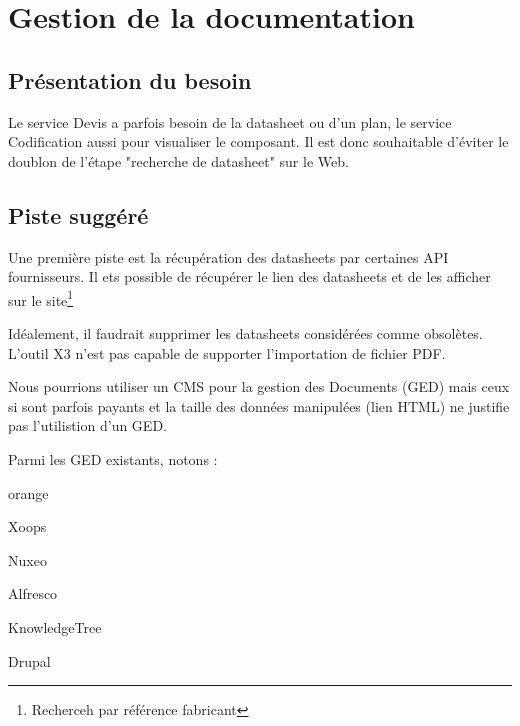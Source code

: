 \chapter{Gestion de la documentation}
\section{Présentation du besoin}

Le service Devis a parfois besoin de la datasheet ou d’un plan, le service Codification aussi
pour visualiser le composant. Il est donc souhaitable d’éviter le doublon de l’étape "recherche de datasheet" sur le Web.


\section{Piste suggéré}

Une première piste est la récupération des datasheets par certaines API fournisseurs. Il ets possible de récupérer le lien des datasheets et de les afficher sur le site\footnote{Recherceh par référence fabricant}


Idéalement, il faudrait supprimer les datasheets considérées comme obsolètes.\\


L’outil X3 n'est pas capable de supporter l’importation de fichier PDF.

Nous pourrions utiliser un CMS pour la gestion des Documents (GED) mais ceux si sont parfois payants et la taille des données manipulées (lien HTML) ne justifie pas l'utilistion d'un GED.

Parmi les GED existants, notons : 

\begin{items}{orange}{\Bullet}
\item Xoops
\item Nuxeo
\item Alfresco
\item KnowledgeTree
\item Drupal
\end{items}
